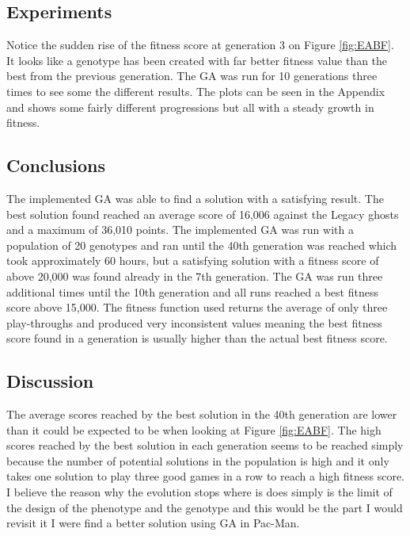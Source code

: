 \documentclass[conference]{IEEEtran}
\begin{document}
\subsection{Experiments}
Notice the sudden rise of the fitness score at generation 3 on Figure \ref{fig:EABF}. It looks like a genotype has been created with far better fitness value than the best from the previous generation. The GA was run for 10 generations three times to see some the different results. The plots can be seen in the Appendix and shows some fairly different progressions but all with a steady growth in fitness.

\subsection{Conclusions}
The implemented GA was able to find a solution with a satisfying result. The best solution found reached an average score of 16,006 against the Legacy ghosts and a maximum of 36,010 points. The implemented GA was run with a population of 20 genotypes and ran until the 40th generation was reached which took approximately 60 hours, but a satisfying solution with a fitness score of above 20,000 was found already in the 7th generation. The GA was run three additional times until the 10th generation and all runs reached a best fitness score above 15,000. The fitness function used returns the average of only three play-throughs and produced very inconsistent values meaning the best fitness score found in a generation is usually higher than the actual best fitness score. 

\subsection{Discussion}
The average scores reached by the best solution in the 40th generation are lower than it could be expected to be when looking at Figure \ref{fig:EABF}. The high scores reached by the best solution in each generation seems to be reached simply because the number of potential solutions in the population is high and it only takes one solution to play three good games in a row to reach a high fitness score. I believe the reason why the evolution stops where is does simply is the limit of the design of the phenotype and the genotype and this would be the part I would revisit it I were find a better solution using GA in Pac-Man.  
\end{document}
